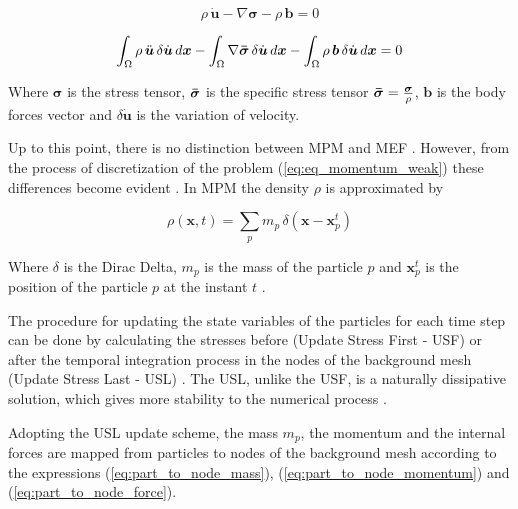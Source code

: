 \documentclass[preprint,12pt]{elsarticle}
\begin{document}
	\begin{equation}
		\rho\, \dot{\boldsymbol{u}}-\nabla\boldsymbol{\sigma}-\rho\, \boldsymbol{b}=0
		\label{eq:eq_momentum_strong}
	\end{equation}

	\begin{equation}
		\int_{\Omega} \rho\, \ddot{\boldsymbol{u}}\, \delta\dot{\boldsymbol{u}}\, d\boldsymbol{x}-\int_{\Omega}\nabla\boldsymbol{\Bar{\sigma}}\, \delta\dot{\boldsymbol{u}}\, d \boldsymbol{x} - \int_{\Omega} \rho\, \boldsymbol{b}\, \delta\dot{\boldsymbol{u}}\, d \boldsymbol{x}=0
		\label{eq:eq_momentum_weak}
	\end{equation}
	
	\noindent Where $\boldsymbol{\sigma}$ is the stress tensor, $\boldsymbol{\Bar{\sigma}}$ is the specific stress tensor  $\boldsymbol{\Bar{\sigma}}=\frac{\boldsymbol{\sigma}}{\rho}$, $\boldsymbol{b}$ is the body forces vector and $\delta \dot{\boldsymbol{u}}$ is the variation of velocity.
	
    Up to this point, there is no distinction between MPM and MEF \cite{bathe_finite_2014}. However, from the process of discretization of the problem (\ref{eq:eq_momentum_weak}) these differences become evident \cite{zhang_material_2017}. In MPM the density $\rho$ is approximated by
	
	\begin{equation}
	    \rho(\boldsymbol{x},t)=\sum_p m_p\,\delta(\boldsymbol{x} - \boldsymbol{x}^t_p)
	\end{equation}
	
    \noindent Where $\delta$ is the Dirac Delta, $m_p$ is the mass of the particle $p$ and $\boldsymbol{x}_p^t$ is the position of the particle $p$ at the instant $t$ .

    The procedure for updating the state variables of the particles for each time step can be done by calculating the stresses before (Update Stress First - USF) or after the temporal integration process in the nodes of the background mesh (Update Stress Last - USL) \cite{zhang_material_2017}. The USL, unlike the USF, is a naturally dissipative solution, which gives more stability to the numerical process \cite{bardenhagen_energy_2002}.
	
    Adopting the USL update scheme, the mass $m_p$, the momentum and the internal forces are mapped from particles to nodes of the background mesh according to the expressions (\ref{eq:part_to_node_mass}), (\ref{eq:part_to_node_momentum}) and (\ref{eq:part_to_node_force}).
	
\end{document}
